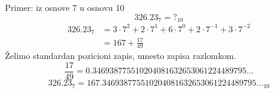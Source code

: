 \begin{frame}[label=04-s006]{Primer: iz osnove 7 u osnovu 10}
\setlength{\abovedisplayskip}{4pt}\setlength{\belowdisplayskip}{4pt}
\[326.23_7={?}_{10}\]
\[\begin{aligned}326.23_7&=3\cdot7^2+2\cdot7^1+6\cdot7^0+2\cdot7^{-1}+3\cdot7^{-2}\\&=167+\frac{17}{49}\end{aligned}\]
Želimo standardan pozicioni zapis, umesto zapisa razlomkom.
\[\frac{17}{49}=0.346938775510204081632653061224489795\ldots\]
\[326.23_7=167.346938775510204081632653061224489795\ldots_{10}\]
\end{frame}
